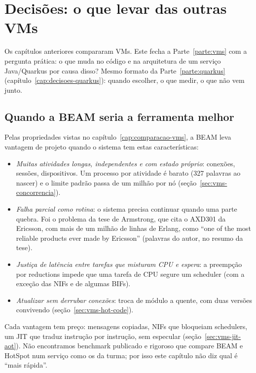 \chapter{Decisões: o que levar das outras VMs}
\label{cap:decisoes-vm}

\proximasaulas

Os capítulos anteriores compararam VMs. Este fecha a Parte~\ref{parte:vms} com a
pergunta prática: o que muda no código e na arquitetura de um serviço
Java/Quarkus por causa disso? Mesmo formato da Parte~\ref{parte:quarkus}
(capítulo~\ref{cap:decisoes-quarkus}): quando escolher, o que medir, o
que não vem junto.

\section{Quando a BEAM seria a ferramenta melhor}

Pelas propriedades vistas no capítulo~\ref{cap:comparacao-vms}, a BEAM
leva vantagem de projeto quando o sistema tem estas características:
\begin{itemize}
\item \emph{Muitas atividades longas, independentes e com estado
  próprio}: conexões, sessões, dispositivos. Um processo por atividade é
  barato (327 palavras ao nascer) e o limite padrão passa de um milhão
  por nó (seção~\ref{sec:vms-concorrencia}).
\item \emph{Falha parcial como rotina}: o sistema precisa continuar
  quando uma parte quebra. Foi o problema da tese de Armstrong, que cita
  o AXD301 da Ericsson, com mais de um milhão de linhas de Erlang, como
  \enquote{one of the most reliable products ever made by Ericsson}
  (palavras do autor, no resumo da tese).
\item \emph{Justiça de latência entre tarefas que misturam CPU e espera}:
  a preempção por reductions impede que uma tarefa de CPU segure um
  scheduler (com a exceção das NIFs e de algumas BIFs).
\item \emph{Atualizar sem derrubar conexões}: troca de módulo a quente,
  com duas versões convivendo (seção~\ref{sec:vms-hot-code}).
\end{itemize}
Cada vantagem tem preço: mensagens copiadas, NIFs que bloqueiam
schedulers, um JIT que traduz instrução por instrução, sem especular
(seção~\ref{sec:vms-jit-aot}). Não encontramos benchmark publicado e
rigoroso que compare BEAM e HotSpot num serviço como os da turma; por
isso este capítulo não diz qual é \enquote{mais rápida}.

